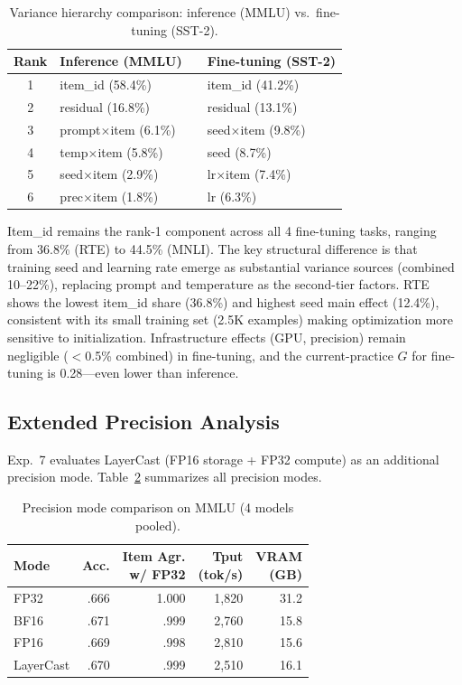 \documentclass[letterpaper,11pt]{article}
\begin{document}
\begin{table}[t]
\centering
\caption{Variance hierarchy comparison: inference (MMLU) vs.\ fine-tuning (SST-2).}
\label{tab:finetuning}
\small
\begin{tabular}{clcl}
\toprule
Rank & Inference (MMLU) & & Fine-tuning (SST-2) \\
\midrule
1 & item\_id (58.4\%) & & item\_id (41.2\%) \\
2 & residual (16.8\%) & & residual (13.1\%) \\
3 & prompt$\times$item (6.1\%) & & seed$\times$item (9.8\%) \\
4 & temp$\times$item (5.8\%) & & seed (8.7\%) \\
5 & seed$\times$item (2.9\%) & & lr$\times$item (7.4\%) \\
6 & prec$\times$item (1.8\%) & & lr (6.3\%) \\
\bottomrule
\end{tabular}
\end{table}

Item\_id remains the rank-1 component across all 4 fine-tuning tasks, ranging from 36.8\% (RTE) to 44.5\% (MNLI).
The key structural difference is that training seed and learning rate emerge as substantial variance sources (combined 10--22\%), replacing prompt and temperature as the second-tier factors.
RTE shows the lowest item\_id share (36.8\%) and highest seed main effect (12.4\%), consistent with its small training set (2.5K examples) making optimization more sensitive to initialization.
Infrastructure effects (GPU, precision) remain negligible ($<$0.5\% combined) in fine-tuning, and the current-practice $G$ for fine-tuning is 0.28---even lower than inference.

\subsection{Extended Precision Analysis}

Exp.~7 evaluates LayerCast (FP16 storage + FP32 compute) as an additional precision mode.
Table~\ref{tab:precision_modes} summarizes all precision modes.

\begin{table}[t]
\centering
\caption{Precision mode comparison on MMLU (4 models pooled).}
\label{tab:precision_modes}
\small
\begin{tabular}{lrrrr}
\toprule
Mode & Acc. & \makecell{Item Agr. \\ w/ FP32} & \makecell{Tput \\ (tok/s)} & \makecell{VRAM \\ (GB)} \\
\midrule
FP32 & .666 & 1.000 & 1,820 & 31.2 \\
BF16 & .671 & .999 & 2,760 & 15.8 \\
FP16 & .669 & .998 & 2,810 & 15.6 \\
LayerCast & .670 & .999 & 2,510 & 16.1 \\
\bottomrule
\end{tabular}
\end{table}
\end{document}
